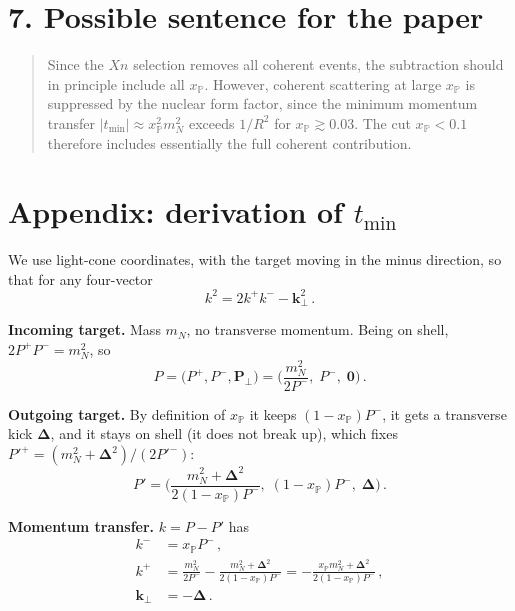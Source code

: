 \documentclass[12pt]{article}
\begin{document}
\section*{7. Possible sentence for the paper}

\begin{quote}\small
Since the $Xn$ selection removes all coherent events, the subtraction should in principle include
all $x_{\mathbb P}$. However, coherent scattering at large $x_{\mathbb P}$ is suppressed by the
nuclear form factor, since the minimum momentum transfer $|t_{\min}|\approx x_{\mathbb P}^2m_N^2$
exceeds $1/R^2$ for $x_{\mathbb P}\gtrsim0.03$. The cut $x_{\mathbb P}<0.1$ therefore includes
essentially the full coherent contribution.
\end{quote}

\section*{Appendix: derivation of $t_{\min}$}

We use light-cone coordinates, with the target moving in the minus direction, so that for any
four-vector
\begin{equation}
  k^2=2k^+k^--\mathbf k_\perp^2\,.
\end{equation}

\textbf{Incoming target.} Mass $m_N$, no transverse momentum. Being on shell, $2P^+P^-=m_N^2$, so
\begin{equation}
  P=\big(P^+,P^-,\mathbf P_\perp\big)=\Big(\frac{m_N^2}{2P^-},\;P^-,\;\mathbf 0\Big)\,.
\end{equation}

\textbf{Outgoing target.} By definition of $x_{\mathbb P}$ it keeps $(1-x_{\mathbb P})P^-$, it gets
a transverse kick $\boldsymbol\Delta$, and it stays on shell (it does not break up), which fixes
$P'^+=(m_N^2+\boldsymbol\Delta^2)/(2P'^-)$:
\begin{equation}
  P'=\Big(\frac{m_N^2+\boldsymbol\Delta^2}{2(1-x_{\mathbb P})P^-},\;(1-x_{\mathbb P})P^-,\;\boldsymbol\Delta\Big)\,.
\end{equation}

\textbf{Momentum transfer.} $k=P-P'$ has
\begin{align}
  k^- &= x_{\mathbb P}P^-\,,\\
  k^+ &= \frac{m_N^2}{2P^-}-\frac{m_N^2+\boldsymbol\Delta^2}{2(1-x_{\mathbb P})P^-}
       = -\frac{x_{\mathbb P}m_N^2+\boldsymbol\Delta^2}{2(1-x_{\mathbb P})P^-}\,,\\
  \mathbf k_\perp &= -\boldsymbol\Delta\,.
\end{align}
\end{document}
